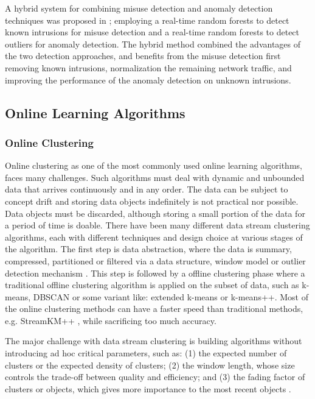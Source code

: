 \documentclass[runningheads]{llncs}
\begin{document}
	A hybrid system for combining misuse detection and anomaly detection techniques was proposed in \cite{Zhang2006}; employing a real-time random forests to detect known intrusions for misuse detection and a real-time random forests to detect outliers for anomaly detection. The hybrid method combined the advantages of the two detection approaches, and benefits from the misuse detection first removing known intrusions, normalization the remaining network traffic, and improving the performance of the anomaly detection on unknown intrusions.
	
	\subsection{Online Learning Algorithms}
	
	\subsubsection{Online Clustering}
	
	Online clustering as one of the most commonly used online learning algorithms, faces many challenges. Such algorithms must deal with dynamic and unbounded data that arrives continuously and in any order. The data can be subject to concept drift and storing data objects indefinitely is not practical nor possible. Data objects must be discarded, although storing a small portion of the data for a period of time is doable. There have been many different data stream clustering algorithms, each with different techniques and design choice at various stages of the algorithm. The first step is data abstraction, where the data is summary, compressed, partitioned or filtered via a data structure, window model or outlier detection mechanism \cite{Silva2013}. This step is followed by a offline clustering phase where a traditional offline clustering algorithm is applied on the subset of data, such as k-means, DBSCAN or some variant like: extended k-means or k-means++. Most of the online clustering methods can have a faster speed than traditional methods, e.g. StreamKM++ \cite{Ackermann2012}, while sacrificing too much accuracy.
	
	The major challenge with data stream clustering is building algorithms without introducing ad hoc critical parameters, such as: (1) the expected number of clusters or the expected density of clusters; (2) the window length, whose size controls the trade-off between quality and efficiency; and (3) the fading factor of clusters or objects, which gives more importance to the most recent objects \cite{Silva2013}.
\end{document}
